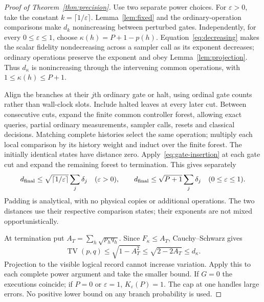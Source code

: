 \documentclass[11pt]{article}
\theoremstyle{remark}
\newcommand{\eps}{\varepsilon}
\begin{document}
\begin{proof}[Proof of Theorem~\ref{thm:precision}]
Use two separate power choices. For $\eps>0$, take the constant
$k=\lceil1/\eps\rceil$. Lemma~\ref{lem:fixed} and the ordinary-operation
comparisons make $d_k$ nonincreasing between perturbed gates.
Independently, for every $0\le\eps\le1$, choose
$\kappa(h)=P+1-p(h)$. Equation~\eqref{eq:decreasing} makes the scalar
fidelity nondecreasing across a sampler call as its exponent decreases;
ordinary operations preserve the exponent and obey
Lemma~\ref{lem:projection}. Thus $d_\kappa$ is nonincreasing through
the intervening common operations, with $1\le\kappa(h)\le P+1$.

Align the branches at their $j$th ordinary gate or halt, using ordinal
gate counts rather than wall-clock slots. Include halted leaves at every
later cut. Between consecutive cuts, expand the finite common controller
forest, allowing exact queries, partial ordinary measurements, sampler
calls, resets and classical decisions. Matching complete histories select
the same operation; multiply each local comparison by its history weight
and induct over the finite forest. The initially identical states have
distance zero. Apply~\eqref{eq:gate-insertion} at each gate cut and expand
the remaining forest to termination. This gives separately
\[
 d_{\rm final}\le\sqrt{\lceil1/\eps\rceil}\sum_j\delta_j
 \quad(\eps>0),\qquad
 d_{\rm final}\le\sqrt{P+1}\sum_j\delta_j
 \quad(0\le\eps\le1).
\]
Padding is analytical, with no physical copies or additional operations.
The two distances use their respective comparison states; their exponents
are not mixed opportunistically.

At termination put $A_T=\sum_h\sqrt{p_hq_h}$. Since
$F_\kappa\le A_T$, Cauchy--Schwarz gives
\[
 \operatorname{TV}(p,q)\le\sqrt{1-A_T^2}
 \le\sqrt{2-2A_T}\le d_\kappa.
\]
Projection to the visible logical record cannot increase variation.
Apply this to each complete power argument and take the smaller bound.
If $G=0$ the executions coincide; if $P=0$ or $\eps=1$, $K_\eps(P)=1$.
The cap at one handles large errors. No positive lower bound on any
branch probability is used.
\end{proof}
\end{document}
